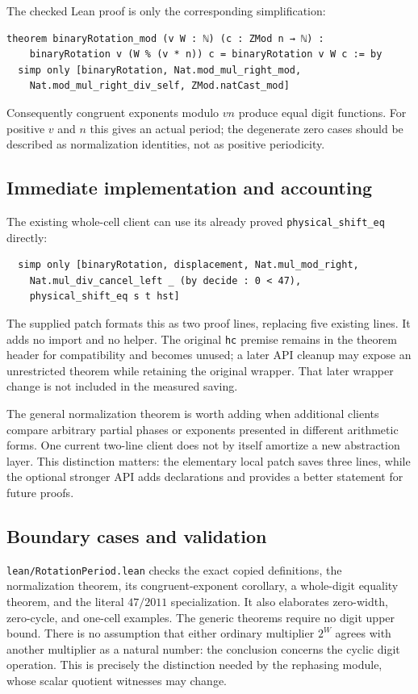 \documentclass[11pt,letterpaper]{article}
\newcommand{\code}[1]{\nolinkurl{#1}}
\begin{document}
The checked Lean proof is only the corresponding simplification:
\begin{lstlisting}
theorem binaryRotation_mod (v W : ℕ) (c : ZMod n → ℕ) :
    binaryRotation v (W % (v * n)) c = binaryRotation v W c := by
  simp only [binaryRotation, Nat.mod_mul_right_mod,
    Nat.mod_mul_right_div_self, ZMod.natCast_mod]
\end{lstlisting}
Consequently congruent exponents modulo $vn$ produce equal digit functions. For positive $v$ and $n$ this gives an actual period; the degenerate zero cases should be described as normalization identities, not as positive periodicity.

\subsection{Immediate implementation and accounting}

The existing whole-cell client can use its already proved \code{physical_shift_eq} directly:
\begin{lstlisting}
  simp only [binaryRotation, displacement, Nat.mul_mod_right,
    Nat.mul_div_cancel_left _ (by decide : 0 < 47),
    physical_shift_eq s t hst]
\end{lstlisting}
The supplied patch formats this as two proof lines, replacing five existing lines. It adds no import and no helper. The original \code{hc} premise remains in the theorem header for compatibility and becomes unused; a later API cleanup may expose an unrestricted theorem while retaining the original wrapper. That later wrapper change is not included in the measured saving.

The general normalization theorem is worth adding when additional clients compare arbitrary partial phases or exponents presented in different arithmetic forms. One current two-line client does not by itself amortize a new abstraction layer. This distinction matters: the elementary local patch saves three lines, while the optional stronger API adds declarations and provides a better statement for future proofs.

\subsection{Boundary cases and validation}

\code{lean/RotationPeriod.lean} checks the exact copied definitions, the normalization theorem, its congruent-exponent corollary, a whole-digit equality theorem, and the literal $47/2011$ specialization. It also elaborates zero-width, zero-cycle, and one-cell examples. The generic theorems require no digit upper bound. There is no assumption that either ordinary multiplier $2^W$ agrees with another multiplier as a natural number: the conclusion concerns the cyclic digit operation. This is precisely the distinction needed by the rephasing module, whose scalar quotient witnesses may change.
\end{document}
